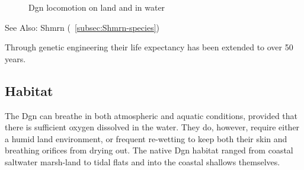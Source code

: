 \begin{figure}
\begin{center}
    \caption{Dgn locomotion on land and in water}
    \label{fig:Dgn-motion}
\end{center}
\end{figure}



See Also: Shmrn (~\ref{subsec:Shmrn-species})

Through genetic engineering their life expectancy has been extended to over 50 years. 

\subsection{Habitat}

The Dgn can breathe in both atmospheric and aquatic conditions,
provided that there is sufficient oxygen dissolved in the water. They
do, however, require either a humid land environment, or frequent
re-wetting to keep both their skin and breathing orifices from drying
out. The native Dgn habitat ranged from coastal saltwater marsh-land
to tidal flats and into the coastal shallows themselves.

